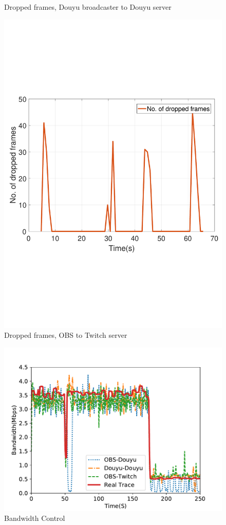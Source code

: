\begin{figure}[htb]
  \caption{Dropped frames, Douyu broadcaster to Douyu server}
  \label{fig:douyu-drop}
\endminipage\hfill
{}%
  \includegraphics[width=0.8\linewidth]{fig/obs_twitch_drop.pdf}
  \caption{Dropped frames, OBS to Twitch server}
  \label{fig:obs-twitch-drop}
\endminipage
\end{figure}

\begin{figure}[htb]
\centering
\includegraphics[width=.8\columnwidth]{fig/vary-bandwidth.pdf}
\caption{Bandwidth Control}
\label{fig:vary-bandwidth}
\end{figure}


